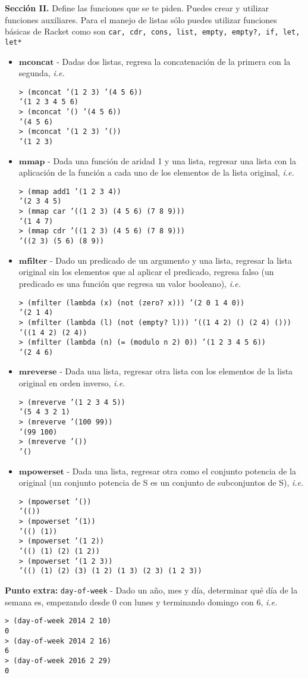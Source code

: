 \documentclass{article}
\begin{document}
\textbf{Sección II.} Define las funciones que se te piden. Puedes crear
y utilizar funciones auxiliares. Para el manejo de listas sólo puedes
utilizar funciones básicas de Racket como son \texttt{car, cdr, cons,
  list, empty, empty?, if, let, let*}

\begin{itemize}
\item $\textbf{mconcat}$ - Dadas dos listas, regresa la concatenación
  de la primera con la segunda, \textit{i.e.}
\begin{verbatim}
> (mconcat ’(1 2 3) ’(4 5 6))
’(1 2 3 4 5 6)
> (mconcat ’() ’(4 5 6))
’(4 5 6)
> (mconcat ’(1 2 3) ’())
’(1 2 3)
\end{verbatim}

\item $\textbf{mmap}$ - Dada una función de aridad 1 y una lista,
  regresar una lista con la aplicación de la función a cada uno de los
  elementos de la lista original, \textit{i.e.}
\begin{verbatim}
> (mmap add1 ’(1 2 3 4))
’(2 3 4 5)
> (mmap car ’((1 2 3) (4 5 6) (7 8 9)))
’(1 4 7)
> (mmap cdr ’((1 2 3) (4 5 6) (7 8 9)))
’((2 3) (5 6) (8 9))
\end{verbatim}

\item $\textbf{mfilter}$ - Dado un predicado de un argumento y una
  lista, regresar la lista original sin los elementos que al aplicar
  el predicado, regresa falso (un predicado es una función que
  regresa un valor booleano), \textit{i.e.}
\begin{verbatim}
> (mfilter (lambda (x) (not (zero? x))) ’(2 0 1 4 0))
’(2 1 4)
> (mfilter (lambda (l) (not (empty? l))) ’((1 4 2) () (2 4) ()))
’((1 4 2) (2 4))
> (mfilter (lambda (n) (= (modulo n 2) 0)) ’(1 2 3 4 5 6))
’(2 4 6)
\end{verbatim}

\item $\textbf{mreverse}$ - Dada una lista, regresar otra lista con
  los elementos de la lista original en orden inverso, \textit{i.e.}
\begin{verbatim}
> (mreverve ’(1 2 3 4 5))
’(5 4 3 2 1)
> (mreverve ’(100 99))
’(99 100)
> (mreverve ’())
’()
\end{verbatim}

\item $\textbf{mpowerset}$ - Dada una lista, regresar otra como el
  conjunto potencia de la original (un conjunto potencia de S es un
  conjunto de subconjuntos de S), \textit{i.e.}
\begin{verbatim}
> (mpowerset ’())
’(())
> (mpowerset ’(1))
’(() (1))
> (mpowerset ’(1 2))
’(() (1) (2) (1 2))
> (mpowerset ’(1 2 3))
’(() (1) (2) (3) (1 2) (1 3) (2 3) (1 2 3))
\end{verbatim}
\end{itemize}

\textbf{Punto extra:} \texttt{day-of-week} - Dado un año, mes y día,
determinar qué día de la semana es, empezando desde 0 con lunes y
terminando domingo con 6, \textit{i.e.}
\begin{verbatim}
> (day-of-week 2014 2 10)
0
> (day-of-week 2014 2 16)
6
> (day-of-week 2016 2 29)
0
\end{verbatim}
\end{document}
